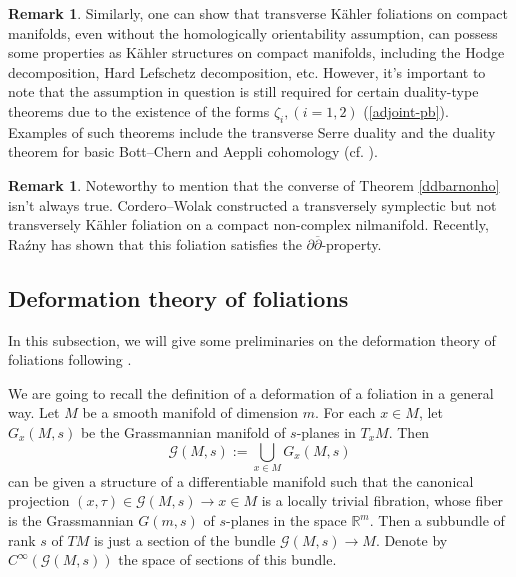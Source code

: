 \documentclass[12pt]{amsart}
\numberwithin{equation}{section}
\theoremstyle{definition}
\theoremstyle{definition}
\theoremstyle{definition}
\newtheorem{remark}  [theorem]     {Remark}
\renewcommand{\1}{\mathsf{1}}
\renewcommand{\>}{\rightarrow}
\newcommand{\p}{\partial}
\newcommand{\bp}{\overline\partial}
\def\p{\partial}
\theoremstyle{plain} %
\theoremstyle{plain} %
\theoremstyle{plain} %
\begin{document}
	
	
	
	\begin{remark}
		Similarly, one can show that transverse K\"ahler foliations on compact manifolds, even without the homologically orientability assumption, can possess some  properties as K\"ahler structures on compact manifolds, including the Hodge decomposition, Hard Lefschetz decomposition, etc. However, it's important to note that the assumption in question is still required for certain duality-type theorems due to the existence of the forms $\zeta_i,(i=1,2)$ (\ref{adjoint-pb}). Examples of such theorems include the transverse Serre duality and the duality theorem for basic Bott--Chern and Aeppli cohomology (cf. \cite[Corollary 3.1]{Ra17}).
	\end{remark}
	
	\begin{remark}
		Noteworthy to mention that the converse of Theorem \ref{ddbarnonho} isn't always true. Cordero--Wolak \cite[Section 2.3]{CW90} constructed a transversely symplectic but not transversely K\"ahler foliation on a compact non-complex nilmanifold. Recently, Ra\'zny \cite[6.3]{Ra17} has shown that this foliation satisfies the $\p\bp$-property.
	\end{remark}
	
	\subsection{Deformation theory of foliations}\label{subsection foliation defor}
	In this subsection, we will give some preliminaries on the deformation theory of foliations following \cite[Section 4]{EKAG97}.
	
	
	
	We are going to recall the definition of a deformation of a foliation in a general way. Let $M$ be a smooth manifold of dimension $m$. For each $x \in M$, let $G_x(M, s)$ be the Grassmannian manifold of $s$-planes in $T_{x} M$. Then
	$$
	\mathcal{G}(M,s):=\bigcup_{x \in M} G_x(M,s)
	$$
	can be given a structure of a differentiable manifold such that the canonical projection $(x, \tau) \in \mathcal{G}(M,s) \rightarrow x \in M$ is a locally trivial fibration, whose fiber is the Grassmannian
	$G(m,s)$ of $s$-planes in the space $\mathbb{R}^{m}$. Then a subbundle of rank $s$ of $T M$ is just a section of the bundle $\mathcal{G}(M,s) \rightarrow M$. Denote by $C^{\infty}(\mathcal{G}(M,s))$ the space of sections of this bundle.
	
\end{document}
